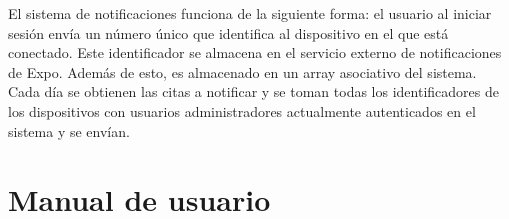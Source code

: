 El sistema de notificaciones funciona de la siguiente forma: el usuario al iniciar sesión envía un número único que identifica al dispositivo en el que está conectado. Este identificador se almacena en el servicio externo de notificaciones de Expo. Además de esto, es almacenado en un array asociativo del sistema. Cada día se obtienen las citas a notificar y se toman todas los identificadores de los dispositivos con usuarios administradores actualmente autenticados en el sistema y se envían. 

\section{Manual de usuario}

